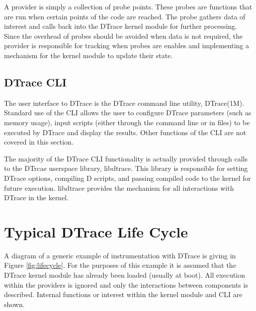 A provider is simply a collection of probe points. These probes are
functions that are run when certain points of the code are
reached. The probe gathers data of interest and calls back into the
DTrace kernel module for further processing. Since the overhead of
probes should be avoided when data is not required, the provider is
responsible for tracking when probes are enables and implementing a
mechanism for the kernel module to update their state.

\subsection{DTrace CLI}

The user interface to DTrace is the DTrace command line utility,
DTrace(1M). Standard use of the CLI allows the user to configure
DTrace parameters (such as memory usage), input scripts (either
through the command line or in files) to be executed by DTrace and
display the results. Other functions of the CLI are not covered in
this section.

The majority of the DTrace CLI functionality is actually provided
through calls to the DTrcae userspace library, libdtrace. This library
is responsible for setting DTrace options, compiling D scripts, and
passing compiled code to the kernel for future execution. libdtrace
provides the mechanism for all interactions with DTrace in the kernel.

\section{Typical DTrace Life Cycle}

A diagram of a generic example of instrumentation with DTrace is
giving in Figure \ref{fig:lifecycle}. For the purposes of this example
it is assumed that the DTrace kernel module has already been loaded
(usually at boot). All execution within the providers is ignored and
only the interactions between components is described. Internal
functions or interest within the kernel module and CLI are shown.

